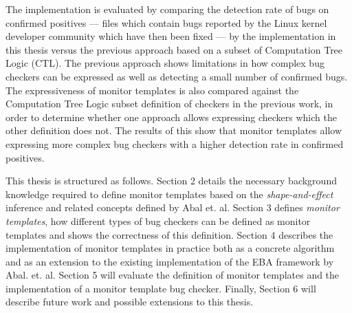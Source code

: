 \newpar The implementation is evaluated by comparing the detection rate of bugs on confirmed positives --- files which contain bugs reported by the Linux kernel developer community which have then been fixed --- by the implementation in this thesis versus the previous approach based on a subset of Computation Tree Logic (CTL). The previous approach shows limitations in how complex bug checkers can be expressed as well as detecting a small number of confirmed bugs. The expressiveness of monitor templates is also compared against the Computation Tree Logic subset definition of checkers in the previous work, in order to determine whether one approach allows expressing checkers which the other definition does not. The results of this show that monitor templates allow expressing more complex bug checkers with a higher detection rate in confirmed positives.   

\newpar This thesis is structured as follows. Section 2 details the necessary background knowledge required to define monitor templates based on the \textit{shape-and-effect} inference and related concepts defined by Abal et. al. Section 3 defines \textit{monitor templates}, how different types of bug checkers can be defined as monitor templates and shows the correctness of this definition. Section 4 describes the implementation of monitor templates in practice both as a concrete algorithm and as an extension to the existing implementation of the EBA framework by Abal. et. al. Section 5 will evaluate the definition of monitor templates and the implementation of a monitor template bug checker. Finally, Section 6 will describe future work and possible extensions to this thesis.    


